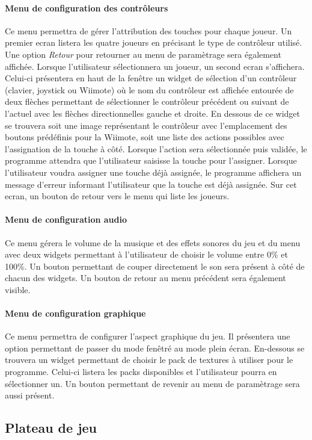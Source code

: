 \paragraph{Menu de configuration des contrôleurs}

Ce menu permettra de gérer l'attribution des touches pour chaque joueur. Un premier ecran listera les quatre joueurs en précisant le type de contrôleur utilisé. Une option \emph{Retour} pour retourner au menu de paramètrage sera également affichée. Lorsque l'utilisateur sélectionnera un joueur, un second ecran s'affichera. Celui-ci présentera en haut de la fenêtre un widget de sélection d'un contrôleur (clavier, joystick ou Wiimote) où le nom du contrôleur est affichée entourée de deux flèches permettant de sélectionner le contrôleur précédent ou suivant de l'actuel avec les flèches directionnelles gauche et droite. En dessous de ce widget se trouvera soit une image représentant le contrôleur avec l'emplacement des boutons prédéfinis pour la Wiimote, soit une liste des actions possibles avec l'assignation de la touche à côté. Lorsque l'action sera sélectionnée puis validée, le programme attendra que l'utilisateur saisisse la touche pour l'assigner. Lorsque l'utilisateur voudra assigner une touche déjà assignée, le programme affichera un message d'erreur informant l'utilisateur que la touche est déjà assignée. Sur cet ecran, un bouton de retour vers le menu qui liste les joueurs.

\paragraph{Menu de configuration audio}

Ce menu gérera le volume de la musique et des effets sonores du jeu et du menu avec deux widgets permettant à l'utilisateur de choisir le volume entre 0\% et 100\%. Un bouton permettant de couper directement le son sera présent à côté de chacun des widgets. Un bouton de retour au menu précédent sera également visible.

\paragraph{Menu de configuration graphique}

Ce menu permettra de configurer l'aspect graphique du jeu. Il présentera une option permettant de passer du mode fenêtré au mode plein écran. En-dessous se trouvera un widget permettant de choisir le pack de textures à utiliser pour le programme. Celui-ci listera les packs disponibles et l'utilisateur pourra en sélectionner un. Un bouton permettant de revenir au menu de paramètrage sera aussi présent.

\subsection{Plateau de jeu}

